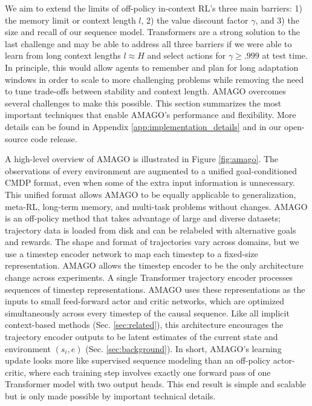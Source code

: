 \label{sec:method}
We aim to extend the limits of off-policy in-context RL's three main barriers: 1) the memory limit or context length $l$, 2) the value discount factor $\gamma$, and 3) the size and recall of our sequence model. Transformers are a strong solution to the last challenge and may be able to address all three barriers if we were able to learn from long context lengths $l \approx H$ and select actions for $\gamma \geq .999$ at test time. In principle, this would allow agents to remember and plan for long adaptation windows in order to scale to more challenging problems while removing the need to tune trade-offs between stability and context length. AMAGO overcomes several challenges to make this possible. This section summarizes the most important techniques that enable AMAGO's performance and flexibility. More details can be found in Appendix \ref{app:implementation_details} and in our open-source code release.

A high-level overview of AMAGO is illustrated in Figure \ref{fig:amago}. The observations of every environment are augmented to a unified goal-conditioned CMDP format, even when some of the extra input information is unnecessary. This unified format allows AMAGO to be equally applicable to generalization, meta-RL, long-term memory, and multi-task problems without changes. AMAGO is an off-policy method that takes advantage of large and diverse datasets; trajectory data is loaded from disk and can be relabeled with alternative goals and rewards. The shape and format of trajectories vary across domains, but we use a timestep encoder network to map each timestep to a fixed-size representation. AMAGO allows the timestep encoder to be the only architecture change across experiments. A single Transformer trajectory encoder processes sequences of timestep representations. AMAGO uses these representations as the inputs to small feed-forward actor and critic networks, which are optimized simultaneously across every timestep of the causal sequence. Like all implicit context-based methods (Sec. \ref{sec:related}), this architecture encourages the trajectory encoder outputs to be latent estimates of the current state and environment $(s_i, e)$ (Sec. \ref{sec:background}). In short, AMAGO's learning update looks more like supervised sequence modeling than an off-policy actor-critic, where each training step involves exactly one forward pass of one Transformer model with two output heads. This end result is simple and scalable but is only made possible by important technical details. 

